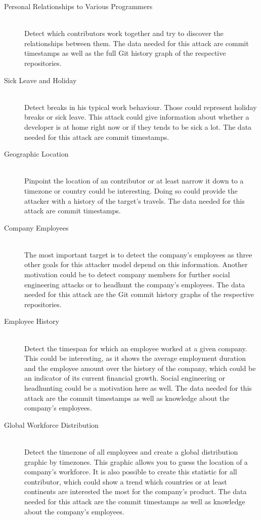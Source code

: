 \begin{description}
    \item[Personal Relationships to Various Programmers] \hfill \\
        Detect which contributors work together and try to discover the relationships between them.
        The data needed for this attack are commit timestamps as well as the full Git history graph of the respective repositories.

    \item[Sick Leave and Holiday] \hfill \\
        Detect breaks in his typical work behaviour. Those could represent holiday breaks or sick leave.
        This attack could give information about whether a developer is at home right now or if they tends to be sick a lot.
        The data needed for this attack are commit timestamps.

    \item[Geographic Location] \hfill \\
        Pinpoint the location of an contributor or at least narrow it down to a timezone or country could be interesting.
        Doing so could provide the attacker with a history of the target's travels.
        The data needed for this attack are commit timestamps.

    \item[Company Employees] \hfill \\
        The most important target is to detect the company's employees as three other goals for this attacker model depend on this information.
        Another motivation could be to detect company members for further social engineering attacks or to headhunt the company's employees.
        The data needed for this attack are the Git commit history graphs of the respective repositories.

    \item[Employee History] \hfill \\
        Detect the timespan for which an employee worked at a given company.
        This could be interesting, as it shows the average employment duration and the employee amount over the history of the company, which could be an indicator of its current financial growth.
        Social engineering or headhunting could be a motivation here as well.
        The data needed for this attack are the commit timestamps as well as knowledge about the company's employees.

    \item[Global Workforce Distribution] \hfill \\
        Detect the timezone of all employees and create a global distribution graphic by timezones.
        This graphic allows you to guess the location of a company's workforce.
        It is also possible to create this statistic for all contributor, which could show a trend which countries or at least continents are interested the most for the company's product.
        The data needed for this attack are the commit timestamps as well as knowledge about the company's employees.


\end{description}
